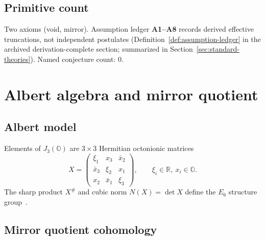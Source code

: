 \documentclass[aps,prd,onecolumn,amsmath,amssymb,nofootinbib,11pt]{revtex4-2}
\numberwithin{equation}{section}
\theoremstyle{plain}
\theoremstyle{definition}
\theoremstyle{remark}
\newcommand{\R}{\mathbb{R}}
\newcommand{\Oct}{\mathbb{O}}
\newcommand{\jalg}{J_3(\mathbb{O})}
\begin{document}
\subsection{Primitive count}

Two axioms (void, mirror). Assumption ledger \textbf{A1--A8} records derived
effective truncations, not independent postulates
(Definition~\ref{def:assumption-ledger} in the archived derivation-complete
section; summarized in Section~\ref{sec:standard-theories}). Named
conjecture count: $0$.%
\appendix
\section{Albert algebra and mirror quotient}
\label{sec:appendix}

\subsection{Albert model}
\label{sec:appendix:albert}

Elements of $\jalg$ are $3\times3$ Hermitian octonionic matrices
\begin{equation}\label{eq:matrix}
  X=\begin{pmatrix}
    \xi_1 & x_3 & \bar x_2\\
    \bar x_3 & \xi_2 & x_1\\
    x_2 & \bar x_1 & \xi_3
  \end{pmatrix},
  \qquad \xi_i\in\R,\ x_i\in\Oct.
\end{equation}
The sharp product $X^{\#}$ and cubic norm $N(X)=\det X$ define the $E_6$
structure group~\cite{SpringerVeldkamp2000,Jacobson1968}.

\subsection{Mirror quotient cohomology}
\label{sec:appendix:quotient}
\end{document}
